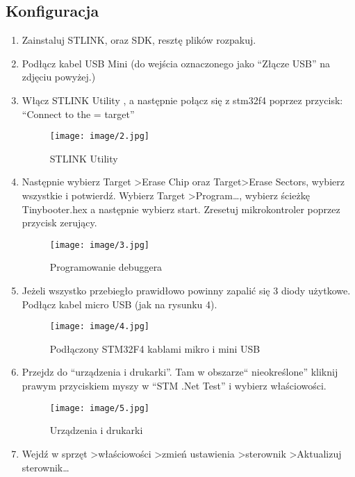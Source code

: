 \documentclass{article}
\begin{document}
\subsection{Konfiguracja}
\begin{enumerate}
\item Zainstaluj STLINK, oraz SDK, resztę plików rozpakuj.
\item Podłącz kabel USB Mini (do wejścia oznaczonego jako “Złącze USB” na zdjęciu powyżej.)
\item Włącz STLINK Utility , a następnie połącz się z stm32f4 poprzez przycisk: “Connect to the = target”

\begin{figure}[H]
\texttt{[image: image/2.jpg]}
\caption{STLINK Utility}
\end{figure}

\item Następnie wybierz Target \textgreater Erase Chip oraz Target\textgreater Erase Sectors, wybierz wszystkie i potwierdź. Wybierz Target \textgreater Program…, wybierz ścieżkę Tinybooter.hex a następnie wybierz start. Zresetuj mikrokontroler poprzez przycisk zerujący.

\begin{figure}[H]
\texttt{[image: image/3.jpg]}
\caption{Programowanie debuggera}
\end{figure}

\item Jeżeli wszystko przebiegło prawidłowo powinny zapalić się 3 diody użytkowe. Podłącz kabel micro USB (jak na rysunku 4).

\begin{figure}[H]
\texttt{[image: image/4.jpg]}
\caption{Podłączony STM32F4 kablami mikro i mini USB}
\end{figure}

\item Przejdz do “urządzenia i drukarki”. Tam w obszarze“ nieokreślone” kliknij prawym przyciskiem myszy w “STM .Net Test” i wybierz właściowości.

\begin{figure}[H]
\texttt{[image: image/5.jpg]}
\caption{Urządzenia i drukarki}
\end{figure}

\item Wejdź w sprzęt \textgreater właściowości \textgreater zmień ustawienia \textgreater sterownik \textgreater Aktualizuj sterownik…


\end{enumerate}
\end{document}
